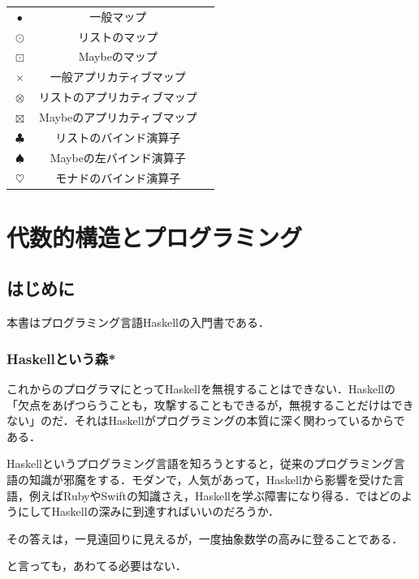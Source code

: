 \documentclass[a4paper]{jsbook}
\newcommand{\programminglanguage}[1]{\textsf{#1}}
\newcommand{\haskell}{\programminglanguage{Haskell}}
\newcommand{\ruby}{\programminglanguage{Ruby}}
\newcommand{\swift}{\programminglanguage{Swift}}
\newenvironment{leader}{\begingroup}{\endgroup}
\newcommand{\mUnitWith}[1]{\langle\!\langle#1\rangle\!\rangle}
\DeclareMathOperator{\mMap}{\bullet}
\DeclareMathOperator{\mMapList}{\odot}
\DeclareMathOperator{\mMapMaybe}{\boxdot}
\DeclareMathOperator{\mAMap}{\times}
\DeclareMathOperator{\mAMapList}{\otimes}
\DeclareMathOperator{\mAMapMaybe}{\boxtimes}
\DeclareMathOperator{\mBindList}{\clubsuit}%
\DeclareMathOperator{\mBindMaybe}{\spadesuit}%
\DeclareMathOperator{\mBind}{\heartsuit}%
\begin{document}
\begin{table}[p]
\begin{center}
\begin{tabular}{||c|c|c||}
\hline
$\mMap$&一般マップ&\\
$\mMapList$&リストのマップ&\\
$\mMapMaybe$&Maybeのマップ&\\
\hline
$\mAMap$&一般アプリカティブマップ&\\
$\mAMapList$&リストのアプリカティブマップ&\\
$\mAMapMaybe$&Maybeのアプリカティブマップ&\\
\hline
$\mBindList$&リストのバインド演算子&\\
$\mBindMaybe$&Maybeの左バインド演算子&\\
$\mBind$&モナドのバインド演算子&\\
\hline
\end{tabular}
\end{center}
\end{table}

\part{代数的構造とプログラミング}

\chapter{はじめに}

\begin{leader}
本書はプログラミング言語\haskell の入門書である．
\end{leader}

\section{\haskell という森*}

これからのプログラマにとって\haskell を無視することはできない．\haskell の「欠点をあげつらうことも，攻撃することもできるが，無視することだけはできない」のだ．それは\haskell がプログラミングの本質に深く関わっているからである．

\haskell というプログラミング言語を知ろうとすると，従来のプログラミング言語の知識が邪魔をする．モダンで，人気があって，\haskell から影響を受けた言語，例えば\ruby や\swift の知識さえ，\haskell を学ぶ障害になり得る．ではどのようにして\haskell の深みに到達すればいいのだろうか．

その答えは，一見遠回りに見えるが，一度抽象数学の高みに登ることである．

と言っても，あわてる必要はない．
\end{document}
